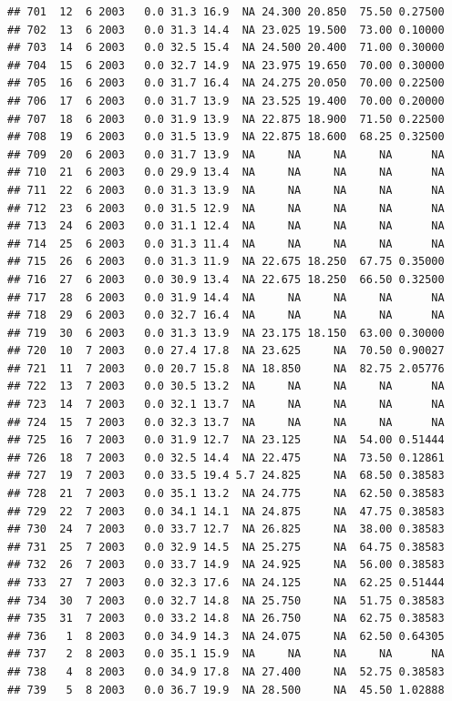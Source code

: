 \documentclass[
]{book}
\begin{document}
\begin{verbatim}
## 701  12  6 2003   0.0 31.3 16.9  NA 24.300 20.850  75.50 0.27500
## 702  13  6 2003   0.0 31.3 14.4  NA 23.025 19.500  73.00 0.10000
## 703  14  6 2003   0.0 32.5 15.4  NA 24.500 20.400  71.00 0.30000
## 704  15  6 2003   0.0 32.7 14.9  NA 23.975 19.650  70.00 0.30000
## 705  16  6 2003   0.0 31.7 16.4  NA 24.275 20.050  70.00 0.22500
## 706  17  6 2003   0.0 31.7 13.9  NA 23.525 19.400  70.00 0.20000
## 707  18  6 2003   0.0 31.9 13.9  NA 22.875 18.900  71.50 0.22500
## 708  19  6 2003   0.0 31.5 13.9  NA 22.875 18.600  68.25 0.32500
## 709  20  6 2003   0.0 31.7 13.9  NA     NA     NA     NA      NA
## 710  21  6 2003   0.0 29.9 13.4  NA     NA     NA     NA      NA
## 711  22  6 2003   0.0 31.3 13.9  NA     NA     NA     NA      NA
## 712  23  6 2003   0.0 31.5 12.9  NA     NA     NA     NA      NA
## 713  24  6 2003   0.0 31.1 12.4  NA     NA     NA     NA      NA
## 714  25  6 2003   0.0 31.3 11.4  NA     NA     NA     NA      NA
## 715  26  6 2003   0.0 31.3 11.9  NA 22.675 18.250  67.75 0.35000
## 716  27  6 2003   0.0 30.9 13.4  NA 22.675 18.250  66.50 0.32500
## 717  28  6 2003   0.0 31.9 14.4  NA     NA     NA     NA      NA
## 718  29  6 2003   0.0 32.7 16.4  NA     NA     NA     NA      NA
## 719  30  6 2003   0.0 31.3 13.9  NA 23.175 18.150  63.00 0.30000
## 720  10  7 2003   0.0 27.4 17.8  NA 23.625     NA  70.50 0.90027
## 721  11  7 2003   0.0 20.7 15.8  NA 18.850     NA  82.75 2.05776
## 722  13  7 2003   0.0 30.5 13.2  NA     NA     NA     NA      NA
## 723  14  7 2003   0.0 32.1 13.7  NA     NA     NA     NA      NA
## 724  15  7 2003   0.0 32.3 13.7  NA     NA     NA     NA      NA
## 725  16  7 2003   0.0 31.9 12.7  NA 23.125     NA  54.00 0.51444
## 726  18  7 2003   0.0 32.5 14.4  NA 22.475     NA  73.50 0.12861
## 727  19  7 2003   0.0 33.5 19.4 5.7 24.825     NA  68.50 0.38583
## 728  21  7 2003   0.0 35.1 13.2  NA 24.775     NA  62.50 0.38583
## 729  22  7 2003   0.0 34.1 14.1  NA 24.875     NA  47.75 0.38583
## 730  24  7 2003   0.0 33.7 12.7  NA 26.825     NA  38.00 0.38583
## 731  25  7 2003   0.0 32.9 14.5  NA 25.275     NA  64.75 0.38583
## 732  26  7 2003   0.0 33.7 14.9  NA 24.925     NA  56.00 0.38583
## 733  27  7 2003   0.0 32.3 17.6  NA 24.125     NA  62.25 0.51444
## 734  30  7 2003   0.0 32.7 14.8  NA 25.750     NA  51.75 0.38583
## 735  31  7 2003   0.0 33.2 14.8  NA 26.750     NA  62.75 0.38583
## 736   1  8 2003   0.0 34.9 14.3  NA 24.075     NA  62.50 0.64305
## 737   2  8 2003   0.0 35.1 15.9  NA     NA     NA     NA      NA
## 738   4  8 2003   0.0 34.9 17.8  NA 27.400     NA  52.75 0.38583
## 739   5  8 2003   0.0 36.7 19.9  NA 28.500     NA  45.50 1.02888

\end{verbatim}
\end{document}
